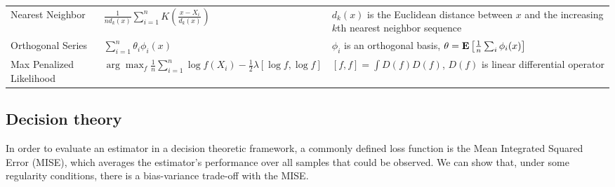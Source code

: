 \documentclass[12pt]{article}
\begin{document}
\begin{longtable}[]{@{}lll@{}}
\begin{minipage}[t]{0.20\columnwidth}
Nearest Neighbor\strut
\end{minipage} & \begin{minipage}[t]{0.32\columnwidth}\raggedright\strut
\(\frac{1}{nd_k(x)} \sum^{n}_{i=1}{K \left( \frac{x-X_i}{d_k(x)}\right)}\)\strut
\end{minipage} & \begin{minipage}[t]{0.38\columnwidth}\raggedright\strut
\(d_k(x)\) is the Euclidean distance between \(x\) and the increasing
\(k\)th nearest neighbor sequence\strut
\end{minipage}\tabularnewline
\begin{minipage}[t]{0.20\columnwidth}\raggedright\strut
Orthogonal Series\strut
\end{minipage} & \begin{minipage}[t]{0.32\columnwidth}\raggedright\strut
\(\sum^{n}_{i=1}\theta_i\phi_i(x)\)\strut
\end{minipage} & \begin{minipage}[t]{0.38\columnwidth}\raggedright\strut
\(\phi_i\) is an orthogonal basis,
\(\theta = \mathbf{E}\left[  \frac{1}{n} \sum_i\phi_i(x) \right]\)\strut
\end{minipage}\tabularnewline
\begin{minipage}[t]{0.20\columnwidth}\raggedright\strut
Max Penalized Likelihood\strut
\end{minipage} & \begin{minipage}[t]{0.32\columnwidth}\raggedright\strut
\(\arg \max_{f} \frac{1}{n} \sum^{n}_{i=1}\log f(X_i)- \frac{1}{2}\lambda\left[\log f, \log f\right]\)\strut
\end{minipage} & \begin{minipage}[t]{0.38\columnwidth}\raggedright\strut
\(\left[f,f\right] = \int D(f)D(f)\), \(D(f)\) is linear differential
operator\strut
\end{minipage}\tabularnewline
\bottomrule
\end{longtable}

\pagebreak

\subsection{Decision theory}\label{decision-theory}

In order to evaluate an estimator in a decision theoretic framework, a
commonly defined loss function is the Mean Integrated Squared Error
(MISE), which averages the estimator's performance over all samples that
could be observed. We can show that, under some regularity conditions,
there is a bias-variance trade-off with the MISE.
\end{document}
